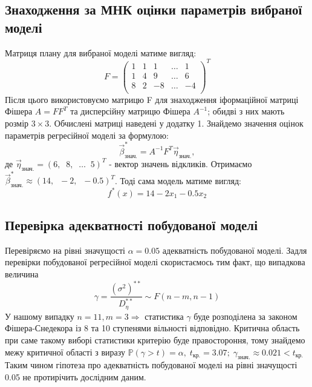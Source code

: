 \documentclass{article}
\begin{document}
    \subsection{Знаходження за МНК оцінки параметрів вибраної моделі}
      Матриця плану для вибраної моделі матиме вигляд:
      \begin{equation}
        F = 
        \begin{pmatrix}
          1 & 1 & 1 & \dots & 1 \\
          1 & 4 & 9 & \dots & 6 \\
          8 & 2 & -8 & \dots & -4 \\
        \end{pmatrix}^T
      \end{equation}
      Після цього використовуємо матрицю F для знаходження іформаційної матриці 
      Фішера $A = FF^T $ та дисперсійну матрицю Фішера $A^{-1}$; обидві з них мають 
      розмір $3 \times 3$.
      Обчислені матриці наведені у додатку 1.
      Знайдемо значення оцінок параметрів регресійної моделі за формулою:
      \begin{equation}
        \vec{\beta}^*_{\text{знач.}} = A^{-1}F^T\vec{\eta}_\text{знач.},
      \end{equation}
      де $\vec{\eta}_\text{знач.} = (6, \;\; 8, \;\; \dots \;\; 5)^T$ - вектор значень 
      відкликів.
      Отримаємо $\vec{\beta}^*_{\text{знач.}} \approx (14, \;\; -2, \;\; -0.5)^T$.
      Тоді сама модель матиме вигляд:
      \begin{equation}
        f^*(x) = 14 - 2 x_1 - 0.5 x_2
      \end{equation}
    \subsection{Перевірка адекватності побудованої моделі}
      Перевіряємо на рівні значущості $\alpha = 0.05$ адекватність побудованої моделі.  
      Задля перевірки побудованої регресійної моделі скористаємось тим факт, що 
      випадкова величина 
      \begin{equation}
        \gamma = \frac{(\sigma^2)^{**}}{D^{**}_\eta}\sim F(n-m, n-1)
      \end{equation}
      У нашому випадку $n = 11, m = 3 \Rightarrow$ статистика $\gamma$ буде 
      розподілена за законом Фішера-Снедекора із 8 та 10 ступенями вільності 
      відповідно.
      Критична область при саме такому виборі статистики критерію буде правостороння, 
      тому знайдемо межу критичної області з виразу $\mathbb{P}
      (\gamma > t) = \alpha, \; t_{\text{кр.}} = 3.07;\;
      \gamma_\text{знач.} \approx 0.021 < t_\text{кр.}$
      Таким чином гіпотеза про адекватність побудованої моделі на рівні значущості 
      0.05 не протирічить дослідним даним.
\end{document}

